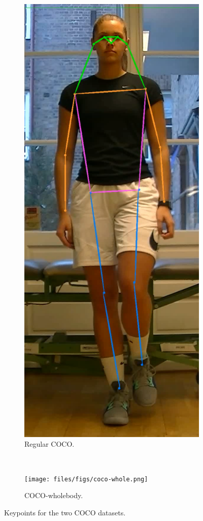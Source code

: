\begin{figure}
\begin{subfigure}[t]{0.4\textwidth}
  \includegraphics[width=\textwidth]{files/figs/coco.png}
  \caption{Regular COCO.}
  \label{fig:coco}
 \end{subfigure}
 ~
 \begin{subfigure}[t]{0.4\textwidth}
  \texttt{[image: files/figs/coco-whole.png]}
  \caption{COCO-wholebody.}
  \label{fig:coco-wholebody}
 \end{subfigure}
 \caption{Keypoints for the two COCO datasets.}
\end{figure}

